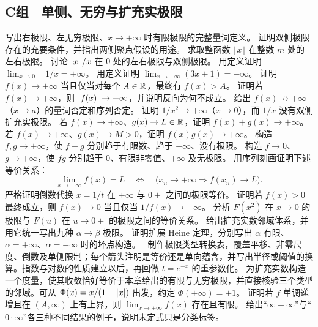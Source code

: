 \subsection*{C组　单侧、无穷与扩充实极限}

\begin{enumerate}[label=\textbf{\thechapter.\arabic*.},ref=\thechapter.\arabic*,leftmargin=3.4em,labelsep=0.7em,itemsep=0.85em,topsep=0.8em,resume]

  写出右极限、左无穷极限、\(x\to+\infty\) 时有限极限的完整量词定义。
   证明双侧极限存在的充要条件，并指出两侧聚点假设的用途。
   求取整函数 \(\lfloor x\rfloor\) 在整数 \(m\) 处的左右极限。
   讨论 \(\left|x\right|/x\) 在 \(0\) 处的左右极限与双侧极限。
   用定义证明 \(\lim_{x\to0+}1/x=+\infty\)。
   用定义证明 \(\lim_{x\to-\infty}(3x+1)=-\infty\)。
   证明 \(f(x)\to+\infty\) 当且仅当对每个 \(A\in\mathbb{R}\)，最终有 \(f(x)>A\)。
   证明若 \(f(x)\to+\infty\)，则 \(\left|f(x)\right|\to+\infty\)，并说明反向为何不成立。
  给出 \(f(x)\not\to+\infty\)（\(x\to a\)）的量词否定和序列否定。
   证明 \(1/x^2\to+\infty\)（\(x\to0\)），而 \(1/x\) 没有双侧扩充实极限。
   若 \(f(x)\to+\infty\)、\(g(x)\to L\in\mathbb{R}\)，证明 \(f(x)+g(x)\to+\infty\)。
   若 \(f(x)\to+\infty\)、\(g(x)\to M>0\)，证明 \(f(x)g(x)\to+\infty\)。
   构造 \(f,g\to+\infty\)，使 \(f-g\) 分别趋于有限数、趋于 \(+\infty\)、没有极限。
   构造 \(f\to0\)、\(g\to+\infty\)，使 \(fg\) 分别趋于 \(0\)、有限非零值、\(+\infty\) 及无极限。
   用序列刻画证明下述等价关系：
 \[
  \lim_{x\to+\infty}f(x)=L
  \quad\Longleftrightarrow\quad
  \bigl(x_n\to+\infty\Rightarrow f(x_n)\to L\bigr).
 \]
   严格证明倒数代换 \(x=1/t\) 在 \(+\infty\) 与 \(0+\) 之间的极限等价。
  证明若 \(f(x)>0\) 最终成立，则 \(f(x)\to0\) 当且仅当 \(1/f(x)\to+\infty\)。
   分析 \(F(x^2)\) 在 \(x\to0\) 的极限与 \(F(u)\) 在 \(u\to0+\) 的极限之间的等价关系。
   给出扩充实数邻域体系，并用它统一写出九种 \(\alpha\to\beta\) 极限。
   证明扩展 Heine 定理，分别写出 \(\alpha\) 有限、\(\alpha=+\infty\)、\(\alpha=-\infty\) 时的坏点构造。
  \ 制作极限类型转换表，覆盖平移、非零尺度、倒数及单侧限制；每个箭头注明是等价还是单向蕴含，并写出半径或阈值的换算。指数与对数的性质建立以后，再回做 \(t=e^{-x}\) 的重参数化。
   为扩充实数构造一个度量，使其收敛恰好等价于本章给出的有限与无穷极限，并直接核验三个类型的邻域。可从 \(\Phi(x)=x/(1+\left|x\right|)\) 出发，约定 \(\Phi(\pm\infty)=\pm1\)。
   证明若 \(f\) 单调递增且在 \((A,\infty)\) 上有上界，则 \(\lim_{x\to+\infty}f(x)\) 存在且有限。
   给出“\(\infty-\infty\)”与“\(0\cdot\infty\)”各三种不同结果的例子，说明未定式只是分类标签。
\end{enumerate}
